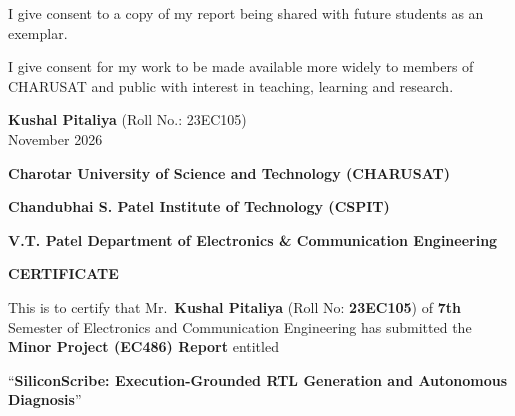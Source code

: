 \documentclass[a4paper,11pt,oneside]{book}
\begin{document}
    \vspace{0.4cm}
    \noindent
    I give consent to a copy of my report being shared with future students as an exemplar.

    \vspace{0.4cm}
    \noindent
    I give consent for my work to be made available more widely to members of CHARUSAT and public with interest in teaching, learning and research.

    \vspace{1.5cm}
    \begin{flushright}
    \textbf{Kushal Pitaliya} (Roll No.: 23EC105)\\[0.3cm]
    November 2026
    \end{flushright}

    \newpage
    \begin{center}
    {\fontsize{16}{18}\selectfont\bfseries
    Charotar University of Science and Technology (CHARUSAT)
    }

    \vspace{0.15cm}

    {\fontsize{14}{16}\selectfont\bfseries
    Chandubhai S. Patel Institute of Technology (CSPIT)
    }

    \vspace{0.15cm}

    {\fontsize{12}{14}\selectfont\bfseries
    V.T. Patel Department of Electronics \& Communication Engineering
    }

    \vspace{1cm}

    {\fontsize{16}{18}\selectfont\bfseries
    CERTIFICATE
    }
    \end{center}

    \vspace{0.8cm}

    \justifying

    This is to certify that Mr.\ \textbf{Kushal Pitaliya} (Roll No: \textbf{23EC105}) of \textbf{7th} Semester of Electronics and Communication Engineering has submitted the \textbf{Minor Project (EC486) Report} entitled

    \vspace{0.2cm}

    \begin{center}
    ``\textbf{SiliconScribe: Execution-Grounded RTL Generation and Autonomous Diagnosis}''
    \end{center}
\end{document}
